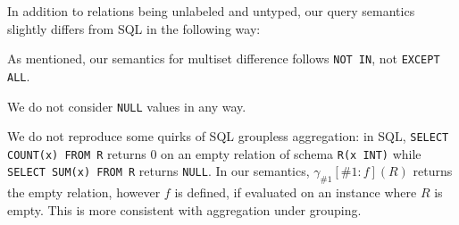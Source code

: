 \begin{toappendix}
	In addition to relations being unlabeled and untyped, our query semantics slightly differs from SQL in the following way:
	\begin{compactitem}
		\item As mentioned, our semantics for multiset difference
		follows \texttt{NOT IN}, not \texttt{EXCEPT ALL}.
		\item We do not consider \texttt{NULL} values in any way.
		\item We do not reproduce some quirks of SQL groupless aggregation: in SQL,
		\texttt{SELECT COUNT(x) FROM R} returns 0 on an empty relation
		of schema \texttt{R(x INT)} while \texttt{SELECT SUM(x) FROM R}
		returns \texttt{NULL}. In our semantics, $\gamma_{\#1}[\#1:
				f](R)$ returns the empty relation, however $f$ is defined, if evaluated on
		an instance where $R$ is empty.
		This is more consistent with
		aggregation under grouping.
	\end{compactitem}
\end{toappendix}
